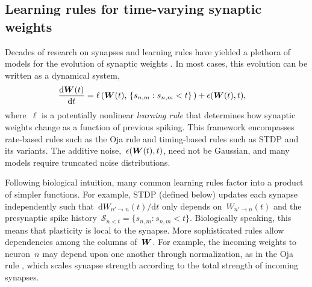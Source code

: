 \subsection{Learning rules for time-varying synaptic weights}
Decades of research on synapses and learning rules have yielded a plethora of models for the evolution of synaptic weights \cite{Caporale-2008}. In most cases, this evolution can be written as a dynamical system,
\begin{align*} \frac{\mathrm{d} \boldsymbol{W}(t)}{\mathrm{d} t} &= \ell\left(\boldsymbol{W}(t), \, \{s_{n,m} : s_{n,m} < t\} \,\right) + \epsilon(\boldsymbol{W}(t), t),
\end{align*}
where~$\ell$ is a potentially nonlinear \emph{learning rule} that determines how synaptic weights change as a function of previous spiking. This framework encompasses rate-based rules such as the Oja rule \cite{Oja-1982} and timing-based rules such as STDP and its variants. The additive noise,~${\epsilon(\boldsymbol{W}(t), t)}$, need not be Gaussian, and many models require truncated noise distributions.

Following biological intuition, many common learning rules factor into a product of simpler functions. For example, STDP (defined below) updates each synapse independently such that~${\mathrm{d}W_{n' \to n}(t)/\mathrm{d}t}$ only depends on~${W_{n'\to n}(t)}$ and the presynaptic spike history~${\mathcal{S}_{n<t}=\{s_{n,m} : s_{n,m} < t\}}$. Biologically speaking, this means that plasticity is local to the synapse. More sophisticated rules allow dependencies among the columns of~$\boldsymbol{W}$. For example, the incoming weights to neuron~$n$ may depend upon one another through normalization, as in the Oja rule \cite{Oja-1982}, which scales synapse strength according to the total strength of incoming synapses. 

